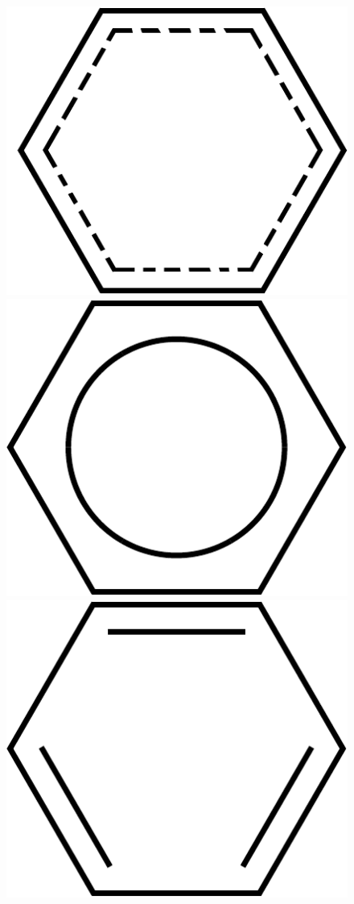 \begin{figure}[h]
\centering
{\includegraphics[scale=0.4, clip, trim = 0mm 0mm 0mm 0mm]{img/aromatic3.pdf}}
{\includegraphics[scale=0.4, clip, trim = 0mm 0mm 0mm 0mm]{img/aromatic1.pdf}}
{\includegraphics[scale=0.4, clip, trim = 0mm 0mm 0mm 0mm]{img/aromatic2.pdf}}

\end{figure}
